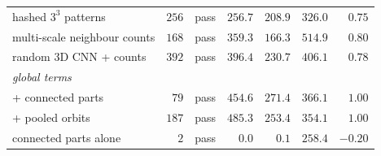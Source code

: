 \begin{table}[t]
{\begin{tabular}{lrcrrrr}
hashed $3^3$ patterns           & $256$ & pass & $256.7$ & $208.9$ & $326.0$ & $0.75$ \\
multi-scale neighbour counts    & $168$ & pass & $359.3$ & $166.3$ & $514.9$ & $0.80$ \\
random 3D CNN + counts          & $392$ & pass & $396.4$ & $230.7$ & $406.1$ & $0.78$ \\
\midrule
\multicolumn{7}{l}{\emph{global terms}} \\
\vkid{} + connected parts       & $79$  & pass & $454.6$ & $271.4$ & $366.1$ & $1.00$ \\
\vkid{} + pooled orbits         & $187$ & pass & $485.3$ & $253.4$ & $354.1$ & $1.00$ \\
connected parts alone           & $2$   & pass & $0.0$   & $0.1$   & $258.4$ & $-0.20$ \\
\bottomrule
\end{tabular}}
\end{table}
